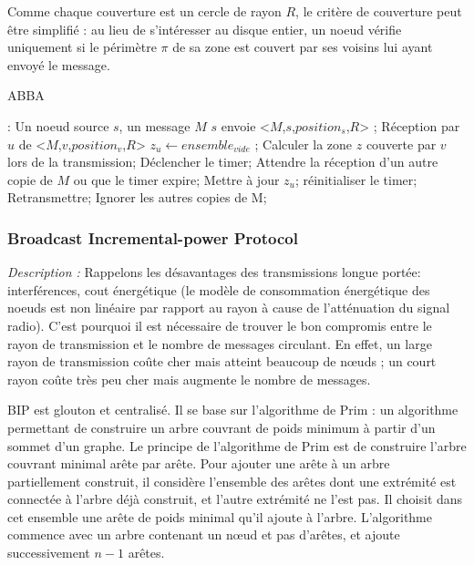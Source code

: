 Comme chaque couverture est un cercle de rayon $R$, le critère de couverture peut être simplifié : au lieu de s'intéresser au disque entier, un noeud vérifie uniquement si le périmètre $\pi$ de sa zone est couvert par ses voisins lui ayant envoyé le message.


\begin{algorithm}[H]
\caption{ABBA}
\label{ABBA}
\begin{algorithmic}
\REQUIRE:
Un noeud source $s$, un message $M$
\STATE $s$ envoie  <$M$,$s$,$position_s$,$R$> ;
\STATE Réception  par  $u$ de  <$M$,$v$,$position_v$,$R$>
\STATE $z_u\leftarrow ensemble_{vide}$ ;
\STATE Calculer la zone $z$ couverte par $v$ lors de la transmission;
\STATE Déclencher le timer;
\REPEAT
    \STATE Attendre la réception d'un autre copie de $M$ ou que le timer expire;
	\STATE Mettre à jour $z_u$;
	\STATE réinitialiser le timer;
    \ENDIF
{}
    \STATE Retransmettre;
\ENDIF
     \STATE Ignorer les autres copies de M;

\end{algorithmic}
\end{algorithm}


\subsubsection{Broadcast Incremental-power Protocol \cite{Wieselthier2000}}



\emph{Description :} Rappelons les désavantages des transmissions longue portée: interférences, cout énergétique (le modèle de consommation énergétique des noeuds est non linéaire par rapport au rayon à cause de l'atténuation du signal radio).
C'est pourquoi il est nécessaire de trouver le bon compromis entre le rayon de transmission et le nombre de messages circulant. En effet, un large rayon de transmission coûte cher mais atteint beaucoup de nœuds ; un court rayon coûte très peu cher mais augmente le nombre de messages. 

BIP est glouton et centralisé. Il se base sur l'algorithme de Prim \cite{Prim1957} : un algorithme permettant de construire un arbre couvrant de poids minimum à partir d'un sommet d'un graphe. Le principe de l'algorithme de Prim est de construire l'arbre couvrant minimal arête par arête. Pour ajouter une arête à un arbre partiellement construit, il considère l'ensemble des arêtes dont une extrémité est connectée à l'arbre déjà construit, et l'autre extrémité ne l'est pas. Il choisit dans cet ensemble une arête de poids minimal qu'il ajoute à l'arbre. L'algorithme commence avec un arbre contenant un nœud et pas d'arêtes, et ajoute successivement $n-1$ arêtes.

